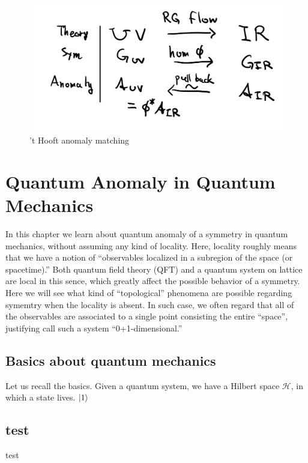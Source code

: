 \documentclass[
]{scrartcl}
\begin{document}
\begin{figure}

{\centering \includegraphics[width=0.5\linewidth]{figs/flow_symmetry} 

}

\caption{'t Hooft anomaly matching}\label{fig:flow}
\end{figure}

\hypertarget{quantum-anomaly-in-quantum-mechanics}{%
\section{Quantum Anomaly in Quantum Mechanics}\label{quantum-anomaly-in-quantum-mechanics}}

In this chapter we learn about quantum anomaly of a symmetry in quantum mechanics, without assuming any kind of locality.
Here, locality roughly means that we have a notion of ``observables localized in a subregion of the space (or spacetime).''
Both quantum field theory (QFT) and a quantum system on lattice are local in this sence, which greatly affect the possible behavior of a symmetry.
Here we will see what kind of ``topological'' phenomena are possible regarding symemtry when the locality is absent.
In such case, we often regard that all of the observables are associated to a single point consisting the entire ``space'', justifying call such a system ``0+1-dimensional.''

\hypertarget{basics-about-quantum-mechanics}{%
\subsection{Basics about quantum mechanics}\label{basics-about-quantum-mechanics}}

Let us recall the basics.
Given a quantum system, we have a Hilbert space \(\mathcal{H}\),
in which a state lives.
\(\ket{1}\)

\hypertarget{test}{%
\subsection{test}\label{test}}

test

\printbibliography
\end{document}
